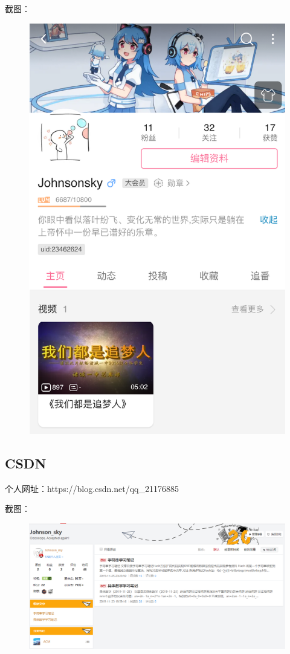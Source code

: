 \documentclass{article}
\begin{document}
截图：
\begin{figure}[H]
    \centering
    \includegraphics[scale=0.28]{F4}
    \label{fig:F4}
\end{figure}

\subsection{CSDN}

个人网址：https://blog.csdn.net/qq\_21176885

截图：
\begin{figure}[H]
    \centering
    \includegraphics[scale=0.5]{F5}
    \label{fig:F5}
\end{figure}
\end{document}
